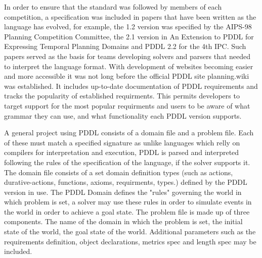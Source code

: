 In order to ensure that the standard was followed by members of each competition, a specification was included in papers that have been written as the language has evolved, for example, the 1.2 version was specified by the AIPS-98 Planning Competition Committee\cite{pddl12:online}, the 2.1 version in An Extension to PDDL for Expressing Temporal Planning Domains\cite{pddl21:online} and PDDL 2.2 for the 4th IPC\cite{pddl22:online}.
Such papers served as the basis for teams developing solvers and parsers that needed to interpret the language format.
With development of websites becoming easier and more accessible it was not long before the official PDDL site planning.wiki was established.
It includes up-to-date documentation of PDDL requirements and tracks the popularity of established requirments. This permits developers to target support for the most popular requirments and users to be aware of what grammar they can use, and what functionality each PDDL version supports.

A general project using PDDL consists of a domain file and a problem file.
Each of these must match a specified signature as unlike languages which relly on compilers for interpretation and execution, PDDL is parsed and interpreted following the rules of the specification of the language, if the solver supports it.
The domain file consists of a set domain definition types (such as actions, durative-actions, functions, axioms, requirments, types.) defined by the PDDL version in use.
The PDDL Domain defines the "rules" governing the world in which problem is set, a solver may use these rules in order to simulate events in the world in order to achieve a goal state.
The problem file is made up of three components.
The name of the domain in which the problem is set, the initial state of the world, the goal state of the world.
Additional parameters such as the requirements definition, object declarations, metrics spec and length spec may be included.

